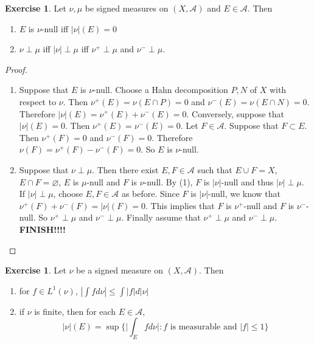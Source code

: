\documentclass{book}
\theoremstyle{definition}
\newtheorem{ex}[definition]{Exercise}
\newcommand{\MA}{\mathcal{A}}
\newcommand{\lex}[1]{\label{ex:#1}}
\DeclareMathOperator*{\0}{\mbf{0}}
\DeclareMathOperator*{\1}{\mbf{1}}
\begin{document}
	\begin{ex} \lex{41014} 
		Let $\nu, \mu$ be signed measures on $(X,\MA)$ and $E \in \MA$. Then 
		\begin{enumerate}
			\item $E$ is $\nu$-null iff $|\nu|(E) = 0$
			\item $\nu \perp \mu$ iff $|\nu| \perp \mu$ iff $\nu^+ \perp \mu$ and $\nu^- \perp \mu$.
		\end{enumerate}
	\end{ex}
	
	\begin{proof}
		\begin{enumerate}
			\item Suppose that $E$ is $\nu$-null. Choose a Hahn decomposition $P,N$ of $X$ with respect to $\nu$. Then $\nu^+(E) = \nu(E \cap P) = 0$ and $\nu^-(E) = \nu(E \cap N) = 0$. Therefore $|\nu|(E) = \nu^+(E) + \nu^-(E) = 0$. Conversely, suppose that $|\nu|(E) = 0$. Then $\nu^+(E) = \nu^-(E) = 0$. Let $F \in \MA$. Suppose that $F \subset E$. Then $\nu^+(F) = 0$ and $\nu^-(F) = 0$. Therefore $\nu(F) = \nu^+(F) - \nu^-(F) = 0$. So $E$ is $\nu$-null.
			
			\item Suppose that $\nu \perp \mu$. Then there exist $E,F \in \MA$ such that $E \cup F = X$, $E \cap F = \varnothing$, $E$ is $\mu$-null and $F$ is $\nu$-null. By (1), $F$ is $|\nu|$-null and thus $|\nu| \perp \mu$. If $|\nu| \perp \mu$, choose $E,F \in \MA$ as before. Since $F$ is $|\nu|$-null, we know that $\nu^+(F) + \nu^-(F) = |\nu|(F) = 0$. This implies that $F$ is $\nu^+$-null and $F$ is $\nu^-$-null. So $\nu^+ \perp \mu$ and $\nu^- \perp \mu$. Finally assume that $\nu^+ \perp \mu$ and $\nu^- \perp \mu$. \textbf{FINISH!!!!}
			
		\end{enumerate}
	\end{proof}
	
	\begin{ex} \lex{41015} 
		Let $\nu$ be a signed measure on $(X, \MA)$. Then 
		\begin{enumerate}
			\item for $f \in L^1(\nu)$, $|\int f d \nu| \leq \int |f| d |\nu|$
			\item if $\nu$ is finite, then for each $E \in \MA$, $$|\nu|(E) = \sup \bigg\{\bigg|\int_E f d \nu \bigg|: f  \text{ is measurable and } |f| \leq 1 \bigg \}$$
		\end{enumerate}
	\end{ex}
	
\end{document}
